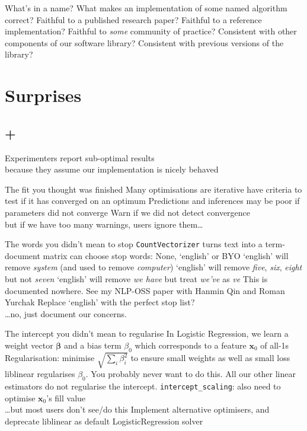 \documentclass[aspectratio=169, 22pt]{beamer}
\newcommand{\hl}{\textcolor{usydred}}
\newenvironment{sectionslide}
			{\subsection*{+}\begin{frame}[fragile,environment=sectionslide]\vfill\begin{center}\Large}
			{\end{center}\vfill\end{frame}}
\begin{document}
\begin{points}{What's in a name?}
	\p What makes an implementation of some named algorithm \hl{correct}?
	\vfill
	\p Faithful to a published research paper?
	\p Faithful to a reference implementation?
	\p Faithful to \emph{some} community of practice?
	\p Consistent with other components of our software library?
	\p Consistent with previous versions of the library?
\end{points}

\section{Surprises}

\begin{sectionslide}
	Experimenters report sub-optimal results\\
	because they assume our implementation is nicely behaved
\end{sectionslide}

\begin{points}{The fit you thought was finished}
	\p Many optimisations are iterative
	\p have criteria to test if it has converged on an optimum
	\p Predictions and inferences may be poor if parameters did not converge
	\pause
	\p[Solution] Warn if we did not detect convergence \\
	but if we have too many warnings, users ignore them\ldots
\end{points}

\begin{points}{The words you didn't mean to stop}
	\p \verb|CountVectorizer| turns text into a term-document matrix
	\p can choose stop words: None, `english' or BYO
	\p `english' will remove \emph{system} (and used to remove \emph{computer})
	\p `english' will remove \emph{five}, \emph{six}, \emph{eight} but not \emph{seven}
	\p `english' will remove \emph{we have} but treat \emph{we've} as \emph{ve}
	\p This is documented nowhere.
	\p See my NLP-OSS paper with Hanmin Qin and Roman Yurchak
	\pause
	\p[Solution] Replace `english' with the \hl{perfect} stop list?\\
	\pause \dots no, just document our concerns.
\end{points}

\begin{points}{The intercept you didn't mean to regularise}
	\p In Logistic Regression, we learn a weight vector $\mathbf{\beta}$
	\p and a bias term $\beta_0$ which corresponds to a feature $\mathbf{x}_0$ of all-1s
	\p Regularisation: minimise $\sqrt{\sum_i \beta_i^2}$ to ensure small weights as well as small loss 
	\p liblinear regularises $\beta_0$. You probably never want to do this.
	\p All our other linear estimators do not regularise the intercept.
	\pause
	\p[Sol'n 1] \verb|intercept_scaling|: also need to optimise $\mathbf{x}_0$'s fill value\\
	\pause
	\ldots but most users don't see/do this
	\p[Sol'n 2] Implement alternative optimisers, and deprecate liblinear as default LogisticRegression solver
\end{points}
\end{document}
